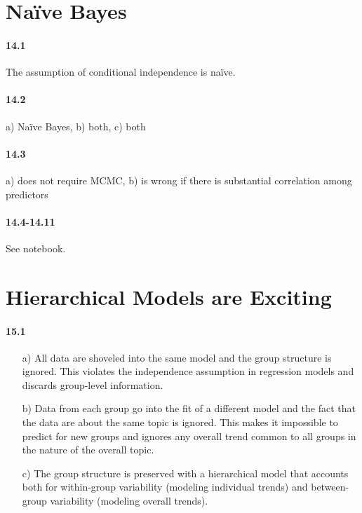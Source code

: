 \documentclass[fontsize=11pt,DIV=18,parskip=half]{scrartcl}
\begin{document}
\section{Naïve Bayes}

\paragraph{14.1} The assumption of conditional independence is naïve.

\paragraph{14.2} a) Naïve Bayes, b) both, c) both

\paragraph{14.3} a) does not require MCMC, b) is wrong if there is substantial correlation among predictors

\paragraph{14.4-14.11} See notebook.

\section{Hierarchical Models are Exciting}

\paragraph{15.1}
\begin{itemize}
\item[a)] All data are shoveled into the same model and the group structure is ignored. This violates the independence assumption in regression models and discards group-level information.
\item[b)] Data from each group go into the fit of a different model and the fact that the data are about the same topic is ignored. This makes it impossible to predict for new groups and ignores any overall trend common to all groups in the nature of the overall topic.
\item[c)] The group structure is preserved with a hierarchical model that accounts both for within-group variability (modeling individual trends) and between-group variability (modeling overall trends).
\end{itemize}
\end{document}
